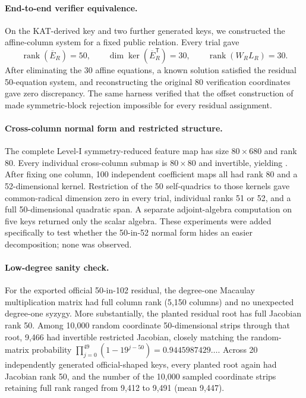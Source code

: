 \documentclass[11pt]{article}
\newcommand{\rank}{\operatorname{rank}}
\newcommand{\transpose}{\mathsf T}
\begin{document}
\paragraph{End-to-end verifier equivalence.}
On the KAT-derived key and two further generated keys, we constructed the affine-column system for a fixed public relation.  Every trial gave
\[
 \rank(\overline E_R)=50,
 \qquad \dim\ker(\overline E_R^\transpose)=30,
 \qquad \rank(W_RL_R)=30.
\]
After eliminating the 30 affine equations, a known solution satisfied the residual 50-equation system, and reconstructing the original 80 verification coordinates gave zero discrepancy.  The same harness verified that the offset construction of  made symmetric-block rejection impossible for every residual assignment.

\paragraph{Cross-column normal form and restricted structure.}
The complete Level-I symmetry-reduced feature map has size $80\times680$ and rank 80.  Every individual cross-column submap is $80\times80$ and invertible, yielding .  After fixing one column, 100 independent coefficient maps all had rank 80 and a 52-dimensional kernel.  Restriction of the 50 self-quadrics to those kernels gave common-radical dimension zero in every trial, individual ranks 51 or 52, and a full 50-dimensional quadratic span.  A separate adjoint-algebra computation on five keys returned only the scalar algebra.  These experiments were added specifically to test whether the 50-in-52 normal form hides an easier decomposition; none was observed.

\paragraph{Low-degree sanity check.}
For the exported official 50-in-102 residual, the degree-one Macaulay
multiplication matrix had full column rank (5,150 columns) and no unexpected
degree-one syzygy.  More substantially, the planted residual root has full
Jacobian rank 50.  Among 10,000 random coordinate 50-dimensional strips through
that root, 9,466 had invertible restricted Jacobian, closely matching the
random-matrix probability $\prod_{j=0}^{49}(1-19^{j-50})=0.9445987429\ldots$.
Across 20 independently generated official-shaped keys, every planted root again
had Jacobian rank 50, and the number of the 10,000 sampled coordinate strips
retaining full rank ranged from 9,412 to 9,491 (mean 9,447).
\end{document}
